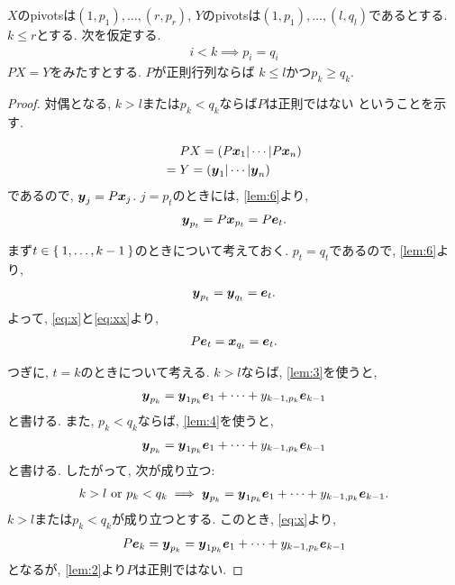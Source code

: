 \begin{lemma}
  \label{lem:8}
  $X$のpivotsは$(1,p_1),\ldots,(r,p_r)$,
  $Y$のpivotsは$(1,p_1),\ldots,(l,q_l)$であるとする.
  $k\leq r$とする.
  次を仮定する.
  \begin{align*}
    i<k \implies p_i=q_i
  \end{align*}
  $PX=Y$をみたすとする.
  $P$が正則行列ならば
  $k\leq l$かつ$p_k\geq q_k$. 
\end{lemma}
\begin{proof}
  対偶となる,
  $k> l$または$p_k< q_k$ならば$P$は正則ではない
  ということを示す.
  
  \begin{align*}
    &PX=(P\boldsymbol{x}_1|\cdots|P\boldsymbol{x}_n)\\
    ={}&Y=(\boldsymbol{y}_1|\cdots|\boldsymbol{y}_n)
  \end{align*}
  であるので, $\boldsymbol{y}_j=P\boldsymbol{x}_j$.
  $j=p_t$のときには, \cref{lem:6}より,
  \begin{align}
    \boldsymbol{y}_{p_t}=P\boldsymbol{x}_{p_t}=P\boldsymbol{e}_t.
    \label{eq:x}
  \end{align}

  まず$t\in\Set{1,\ldots,k-1}$のときについて考えておく.
  $p_t=q_t$であるので,
  \cref{lem:6}より,
  \begin{align}
    \boldsymbol{y}_{p_t}=\boldsymbol{y}_{q_t}=\boldsymbol{e}_t.
    \label{eq:xx}
  \end{align}
  よって, \eqref{eq:x}と\eqref{eq:xx}より,
  \begin{align*}
    P\boldsymbol{e}_t=\boldsymbol{x}_{q_t}=\boldsymbol{e}_t.
  \end{align*}


  つぎに, $t=k$のときについて考える.
  $k>l$ならば, \cref{lem:3}を使うと,
  \begin{align*}
    \boldsymbol{y}_{p_k}=\boldsymbol{y}_{1p_k}\boldsymbol{e}_1+\cdots+y_{k-1,p_k}\boldsymbol{e}_{k-1}
  \end{align*}
  と書ける.
  また, $p_k<q_k$ならば, \cref{lem:4}を使うと,
  \begin{align*}
    \boldsymbol{y}_{p_k}=\boldsymbol{y}_{1p_k}\boldsymbol{e}_1+\cdots+y_{k-1,p_k}\boldsymbol{e}_{k-1}
  \end{align*}
  と書ける.
  したがって,
  次が成り立つ:
  \begin{align*}
    k>l \text{ or } p_k<q_k
    \implies
    \boldsymbol{y}_{p_k}=\boldsymbol{y}_{1p_k}\boldsymbol{e}_1+\cdots+y_{k-1,p_k}\boldsymbol{e}_{k-1}.
  \end{align*}
  $k>l$または$p_k<q_k$が成り立つとする.
  このとき, \cref{eq:x}より,
  \begin{align*}
    P\boldsymbol{e}_k
    =\boldsymbol{y}_{p_k}
    =\boldsymbol{y}_{1p_k}\boldsymbol{e}_1+\cdots+y_{k-1,p_k}\boldsymbol{e}_{k-1}
  \end{align*}
  となるが,
  \cref{lem:2}より$P$は正則ではない.
\end{proof}

